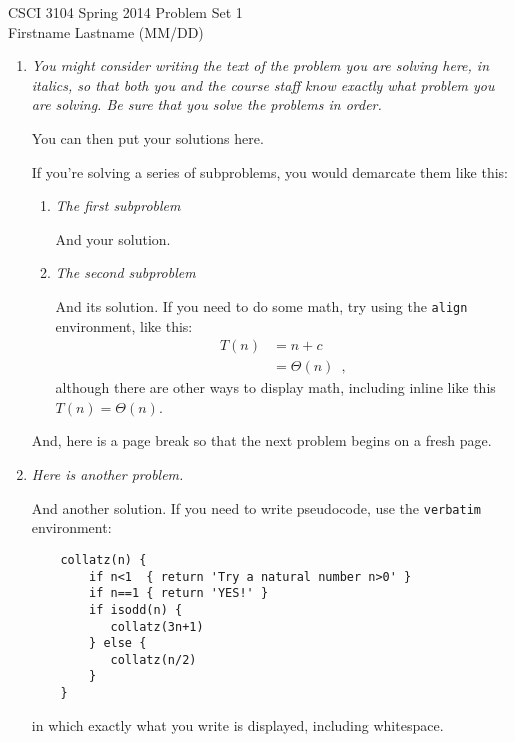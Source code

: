 \documentclass[12pt]{article}
\begin{document}
CSCI 3104 Spring 2014 \hfill Problem Set 1\\
Firstname Lastname (MM/DD) 

\hrulefill

\begin{enumerate}

	\item	\textit{You might consider writing the text of the problem you are solving here, in italics, so that both you and the course staff know exactly what problem you are solving. Be sure that you solve the problems in order.}
	
	You can then put your solutions here.
	
	If you're solving a series of subproblems, you would demarcate them like this:
	\begin{enumerate}
	\item \textit{The first subproblem}
	
	And your solution.
	
	\item \textit{The second subproblem}
	
	And its solution. If you need to do some math, try using the {\tt align} environment, like this:
	\begin{align}
	T(n) & = n+c \nonumber \\
	& = \Theta(n) \enspace ,
	\end{align}
	although there are other ways to display math, including inline like this $T(n)=\Theta(n)$.
	
	\end{enumerate}
	
	And, here is a page break so that the next problem begins on a fresh page.
	
	\newpage
	
	\item \textit{Here is another problem.}
	
	And another solution. If you need to write pseudocode, use the {\tt verbatim} environment:
	\begin{verbatim}
	collatz(n) {
	    if n<1  { return 'Try a natural number n>0' }
	    if n==1 { return 'YES!' }
	    if isodd(n) {
	       collatz(3n+1)
	    } else {
	       collatz(n/2)
	    }
	}
	\end{verbatim}
	in which exactly what you write is displayed, including whitespace.
	
		
\end{enumerate}
\end{document}

